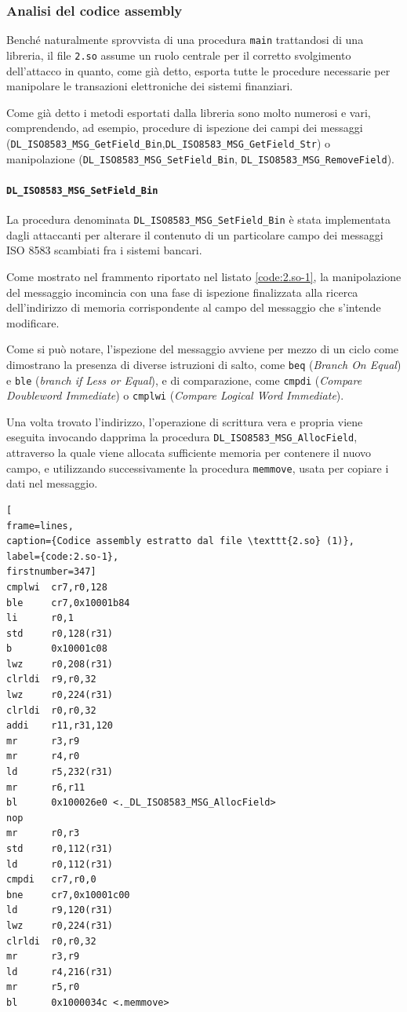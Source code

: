 \documentclass[10pt,a4paper, titlepage]{report}
\begin{document}
\subsubsection{Analisi del codice assembly}

Benché naturalmente sprovvista di una procedura \texttt{main} trattandosi di una libreria, il file \texttt{2.so} assume un ruolo centrale per il corretto svolgimento dell'attacco in quanto, come già detto, esporta tutte le procedure necessarie per manipolare le transazioni elettroniche dei sistemi finanziari.

Come già detto i metodi esportati dalla libreria sono molto numerosi e vari, comprendendo, ad esempio, procedure di ispezione dei campi dei messaggi (\texttt{DL\_ISO8583\_MSG\_GetField\_Bin},\texttt{DL\_ISO8583\_MSG\_GetField\_Str}) o manipolazione (\texttt{DL\_ISO8583\_MSG\_SetField\_Bin}, \texttt{DL\_ISO8583\_MSG\_RemoveField}).

\paragraph{\texttt{DL\_ISO8583\_MSG\_SetField\_Bin}}

La procedura denominata \texttt{DL\_ISO8583\_MSG\_SetField\_Bin} è stata implementata dagli attaccanti per alterare il contenuto di un particolare campo dei messaggi ISO 8583 scambiati fra i sistemi bancari.

Come mostrato nel frammento riportato nel listato \ref{code:2.so-1}, la manipolazione del messaggio incomincia con una fase di ispezione finalizzata alla ricerca dell'indirizzo di memoria corrispondente al campo del messaggio che s'intende modificare. 

Come si può notare, l'ispezione del messaggio avviene per mezzo di un ciclo come dimostrano la presenza di diverse istruzioni di salto, come \texttt{beq} (\textit{Branch On Equal}) e \texttt{ble} (\textit{branch if Less or Equal}), e di comparazione, come \texttt{cmpdi} (\textit{Compare Doubleword Immediate}) o \texttt{cmplwi} (\textit{Compare Logical Word Immediate}).

Una volta trovato l'indirizzo, l'operazione di scrittura vera e propria viene eseguita invocando dapprima la procedura \texttt{DL\_ISO8583\_MSG\_AllocField}, attraverso la quale viene allocata sufficiente memoria per contenere il nuovo campo, e utilizzando successivamente la procedura \texttt{memmove}, usata per copiare i dati nel messaggio.

\begin{lstlisting}[
frame=lines, 
caption={Codice assembly estratto dal file \texttt{2.so} (1)}, 
label={code:2.so-1},
firstnumber=347]
cmplwi  cr7,r0,128
ble     cr7,0x10001b84
li      r0,1
std     r0,128(r31)
b       0x10001c08
lwz     r0,208(r31)
clrldi  r9,r0,32
lwz     r0,224(r31)
clrldi  r0,r0,32
addi    r11,r31,120
mr      r3,r9
mr      r4,r0
ld      r5,232(r31)
mr      r6,r11
bl      0x100026e0 <._DL_ISO8583_MSG_AllocField>
nop
mr      r0,r3
std     r0,112(r31)
ld      r0,112(r31)
cmpdi   cr7,r0,0
bne     cr7,0x10001c00
ld      r9,120(r31)
lwz     r0,224(r31)
clrldi  r0,r0,32
mr      r3,r9
ld      r4,216(r31)
mr      r5,r0
bl      0x1000034c <.memmove>
\end{lstlisting}
\end{document}
